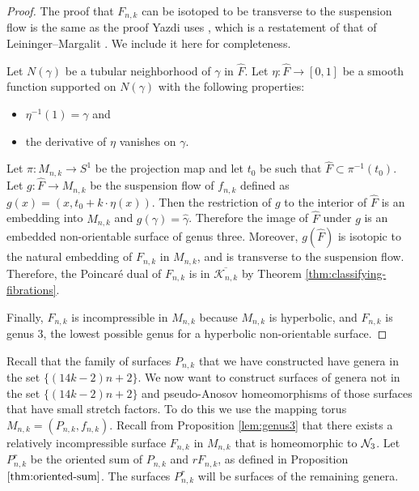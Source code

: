 \begin{proof}

  The proof that $F_{n,k}$ can be isotoped to be transverse to the suspension flow is the same as the
  proof Yazdi uses \cite{yazdi2018pseudo}, which is a restatement of that of Leininger--Margalit \cite{leininger2013number}. We include it here for completeness.  
  
  Let $N(\gamma)$ be a tubular neighborhood of $\gamma$ in $\hat{F}$.  Let $\eta: \hat{F} \xrightarrow{} [0,1]$ be a smooth function supported on $N(\gamma)$ with the following properties:
  \begin{itemize}
      \item $\eta^{-1}(1) = \gamma$ and
      \item the derivative of $\eta$ vanishes on $\gamma$. 
    \end{itemize}
Let $\pi:M_{n,k}\rightarrow S^1$ be the projection map and let $t_0$ be such that $\hat{F}\subset\pi^{-1}(t_0)$.  Let $g: \hat{F} \xrightarrow{} M_{n,k}$ be the suspension flow of $f_{n,k}$ defined as $g(x) =(x,t_0+k\cdot\eta(x))$. Then the restriction of $g$ to the interior of $\hat{F}$ is an embedding into $M_{n,k}$ and $g(\gamma) = \hat{\gamma}$. Therefore the image of $\hat{F}$ under $g$ is an embedded non-orientable surface of genus three. Moreover, $g(\hat{F})$ is isotopic to the natural embedding of $F_{n,k}$ in $M_{n,k}$, and is transverse to the suspension flow.  
  Therefore, the Poincar\'e dual of $F_{n,k}$ is in $\overline{\mathcal{K}_{n,k}}$ by Theorem \ref{thm:classifying-fibrations}.
   
  Finally, $F_{n,k}$ is incompressible in $M_{n,k}$ because $M_{n,k}$ is hyperbolic, and $F_{n,k}$ is genus $3$, the
  lowest possible genus for a hyperbolic non-orientable surface.
\end{proof}



Recall that the family of surfaces $P_{n,k}$ that we have constructed have genera in the set $\{(14k-2)n+2\}$.
We now want to construct surfaces of genera not in the set $\{(14k-2)n+2\}$ and pseudo-Anosov homeomorphisms of those surfaces that have small stretch factors.  To do this we use the mapping torus $M_{n,k}= (P_{n,k},f_{n,k})$. Recall from Proposition \ref{lem:genus3} that there exists a relatively incompressible surface $F_{n,k}$ in $M_{n,k}$ that is homeomorphic to $\mathcal{N}_3$.  Let $P_{n,k}^r$ be the oriented sum of $P_{n,k}$ and
$rF_{n,k}$, as defined in Proposition $\ref{thm:oriented-sum}$.  The surfaces $P_{n,k}^r$ will be surfaces of the remaining genera.

